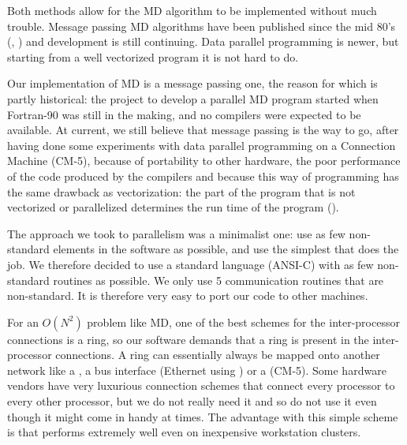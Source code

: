 Both methods allow for the MD algorithm to be implemented without much
trouble. Message passing MD algorithms have been published
since the mid 80's (\cite{Fincham87}, \cite{Raine89}) 
and development is still continuing. 
Data parallel programming is newer,
but starting from a well vectorized program it is not hard to do.

Our implementation of MD is a message passing one, the reason for which
is partly historical: the project to develop a parallel MD program started
when Fortran-90 was still in the making, and no compilers were
expected to be available. 
At current, we still believe that message passing is the way
to go, after having done some experiments with data parallel programming on a
Connection Machine (CM-5), because of portability to other hardware,
the poor performance of the code produced by the compilers 
and because this way of programming
has the same drawback as vectorization: the part of the program that is
not vectorized or parallelized determines the run time of the program
().

The approach we took to parallelism was a minimalist one: use as few
non-standard elements in the software as possible, and use the
simplest  that does the job. We therefore 
decided to use a standard language (ANSI-C) with as few non-standard
routines as possible. We only use 5 communication routines that are
non-standard. It is therefore very easy to port our code to other machines.

For an $O(N^2)$ problem like MD, one of the best schemes for the
inter-processor connections is a ring, so our software demands that a
ring is present in the inter-processor connections. A ring can essentially
always be mapped onto another network like a , a
bus interface (Ethernet {\eg} using 
 ) or 
a 
(CM-5). Some hardware vendors have very luxurious connection schemes
that connect every processor to every other processor, but we do not
really need it and so do not use it even though it might come in handy
at times. The advantage with this simple scheme is that {\gromacs}
performs extremely well even on inexpensive workstation clusters.


